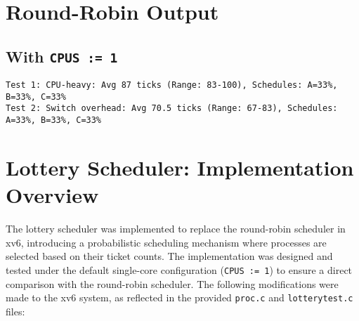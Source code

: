 \documentclass{article}
\begin{document}
\section{Round-Robin Output}
\subsection{With \texttt{CPUS := 1}}
\begin{lstlisting}[breaklines=true]
Test 1: CPU-heavy: Avg 87 ticks (Range: 83-100), Schedules: A=33%, B=33%, C=33%
Test 2: Switch overhead: Avg 70.5 ticks (Range: 67-83), Schedules: A=33%, B=33%, C=33%
\end{lstlisting}

\section{Lottery Scheduler: Implementation Overview}
The lottery scheduler was implemented to replace the round-robin scheduler in xv6, introducing a probabilistic scheduling mechanism where processes are selected based on their ticket counts. The implementation was designed and tested under the default single-core configuration (\texttt{CPUS := 1}) to ensure a direct comparison with the round-robin scheduler. The following modifications were made to the xv6 system, as reflected in the provided \texttt{proc.c} and \texttt{lotterytest.c} files:
\end{document}
